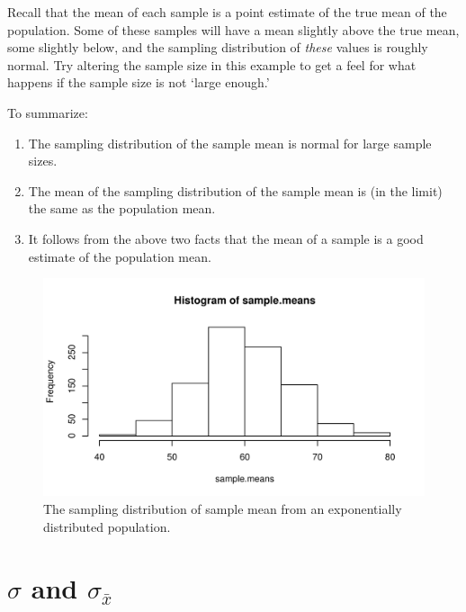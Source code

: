 \documentclass[12pt]{book}\usepackage[]{graphicx}\usepackage[]{color}
\makeatletter
\def\maxwidth{ %
  \ifdim\Gin@nat@width>\linewidth
    \linewidth
  \else
    \Gin@nat@width
  \fi
}
\newenvironment{knitrout}{}{} %
\makeatother
\begin{document}
\noindent
Recall that the mean of each sample is a point estimate of the
true mean of the population. Some of these samples will have a mean slightly above
the true mean, some slightly below, and the sampling distribution of
\emph{these} values is roughly normal.  Try altering the sample size
in this example to get a feel for what happens if the sample size is
not `large enough.'

To summarize:

\begin{enumerate}
\item The sampling distribution of the sample mean is normal for large sample sizes. 
\item The mean of the sampling distribution of the sample mean is (in
  the limit) the same as the population mean.
\item It follows from the above two facts that the mean of a sample is
  a good estimate of the population mean.
\end{enumerate}

\begin{figure}[!htbp]
  \centering
\begin{knitrout}
\color{fgcolor}
\includegraphics[width=\maxwidth]{figure/unnamed-chunk-22-1} 

\end{knitrout}
  \caption{The sampling distribution of sample mean from an exponentially distributed population.}  \label{fig:exponentialsdsm}
\end{figure}

\section{$\sigma$ and $\sigma_{\bar{x}}$}
\end{document}
